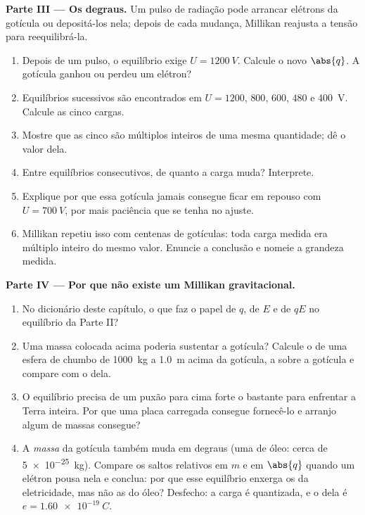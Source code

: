 \begin{problem}
\medskip
\noindent\textbf{Parte III --- Os degraus.}
Um pulso de radiação pode arrancar elétrons da gotícula ou depositá-los
nela; depois de cada mudança, Millikan reajusta a tensão para
reequilibrá-la.
\begin{enumerate}[resume]
  \item Depois de um pulso, o equilíbrio exige $U = \qty{1200}{V}$.
        Calcule o novo $\abs{q}$. A gotícula ganhou ou perdeu um elétron?
  \item Equilíbrios sucessivos são encontrados em $U = 1200$, $800$,
        $600$, $480$ e \qty{400}{V}. Calcule as cinco cargas.
  \item Mostre que as cinco são múltiplos inteiros de uma mesma
        quantidade; dê o valor dela.
  \item Entre equilíbrios consecutivos, de quanto a carga muda?
        Interprete.
  \item Explique por que essa gotícula jamais consegue ficar em repouso
        com $U = \qty{700}{V}$, por mais paciência que se tenha no ajuste.
  \item Millikan repetiu isso com centenas de gotículas: toda carga
        medida era múltiplo inteiro do mesmo valor. Enuncie a conclusão e
        nomeie a grandeza medida.
\end{enumerate}

\medskip
\noindent\textbf{Parte IV --- Por que não existe um Millikan gravitacional.}
\begin{enumerate}[resume]
  \item No dicionário deste capítulo, o que faz o papel de $q$, de $E$ e
        de $qE$ no equilíbrio da Parte II?
  \item Uma massa colocada acima poderia sustentar a gotícula? Calcule o
         de uma esfera de chumbo de \qty{1000}{kg} a \qty{1.0}{m}
        acima da gotícula, a  sobre a gotícula e compare com o 
        dela.
  \item O equilíbrio precisa de um puxão para cima forte o bastante para
        enfrentar a Terra inteira. Por que uma placa carregada consegue
        fornecê-lo e arranjo algum de massas consegue?
  \item A \emph{massa} da gotícula também muda em degraus (uma 
        de óleo: cerca de \qty{5e-25}{kg}). Compare os saltos relativos em
        $m$ e em $\abs{q}$ quando um elétron pousa nela e conclua: por que
        esse equilíbrio enxerga os  da eletricidade, mas não as
         do óleo? Desfecho: a carga é quantizada, e o  dela
        é $e = \qty{1.60e-19}{C}$.
\end{enumerate}
\end{problem}
